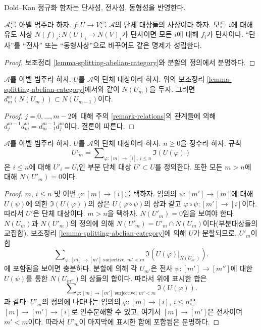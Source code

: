 \begin{lemma}
\label{lemma-injective-map-simplicial-abelian}
\begin{slogan}
Dold--Kan 정규화 함자는 단사성, 전사성, 동형성을 반영한다.
\end{slogan}
$\mathcal{A}$를 아벨 범주라 하자.
$f : U \to V$를 $\mathcal{A}$의 단체 대상들의 사상이라 하자.
모든 $i$에 대해 유도 사상 $N(f)_i : N(U)_i \to N(V)_i$가
단사이면 모든 $i$에 대해 $f_i$가 단사이다.
``단사''를 ``전사'' 또는 ``동형사상''으로 바꾸어도 같은 명제가
성립한다.
\end{lemma}

\begin{proof}
보조정리 \ref{lemma-splitting-abelian-category}와 분할의 정의에서
분명하다.
\end{proof}


\begin{lemma}
\label{lemma-N-d-in-N}
$\mathcal{A}$를 아벨 범주라 하자.
$U$를 $\mathcal{A}$의 단체 대상이라 하자.
위의 보조정리 \ref{lemma-splitting-abelian-category}에서와 같이
$N(U_m)$을 두자.
그러면 $d^m_m(N(U_m)) \subset N(U_{m - 1})$이다.
\end{lemma}

\begin{proof}
$j = 0, \ldots, m - 2$에 대해 주의 \ref{remark-relations}의 관계들에
의해 $d^{m - 1}_j d^m_m = d^{m - 1}_{m - 1} d^m_j$이다.
결론이 따른다.
\end{proof}

\begin{lemma}
\label{lemma-simplicial-abelian-n-skel-sub}
$\mathcal{A}$를 아벨 범주라 하자.
$U$를 $\mathcal{A}$의 단체 대상이라 하자.
$n \geq 0$을 정수라 하자. 규칙
$$
U'_m = \sum\nolimits_{\varphi : [m] \to [i], \ i\leq n} \Im(U(\varphi))
$$
은 $i \leq n$에 대해 $U'_i = U_i$인 부분 단체 대상
$U' \subset U$를 정의한다. 또한 모든 $m > n$에 대해
$N(U'_m) = 0$이다.
\end{lemma}

\begin{proof}
$m$, $i \leq n$ 및 어떤 $\varphi : [m] \to [i]$를 택하자.
임의의 $\psi : [m'] \to [m]$에 대해 $U(\psi)$에 의한
$\Im(U(\varphi))$의 상은 $U(\varphi \circ \psi)$의 상과 같고
$\varphi \circ \psi : [m'] \to [i]$이다.
따라서 $U'$은 단체 대상이다. $m > n$을 택하자.
$N(U'_m) = 0$임을 보여야 한다.
$N(U_m)$과 $N(U'_m)$의 정의에 의해
$N(U'_m) = U'_m \cap N(U_m)$이다(부분대상들의 교집합).
보조정리 \ref{lemma-splitting-abelian-category}에 의해 $U$가 분할되므로,
$U'_m$이 합
$$
\sum\nolimits_{\varphi : [m] \to [m']\text{ surjective}, \ m' < m}
\Im(U(\varphi)|_{N(U_{m'})}).
$$
에 포함됨을 보이면 충분하다. 분할에 의해 각 $U_{m'}$은 전사
$\psi : [m'] \to [m'']$에 대한 $U(\psi)$를 통한 $N(U_{m''})$의
상들의 합이다. 따라서 위에 표시한 합은
$$
\sum\nolimits_{\varphi : [m] \to [m']\text{ surjective}, \ m' < m}
\Im(U(\varphi)).
$$
과 같다. $U'_m$의 정의에 나타나는 임의의
$\varphi : [m] \to [i]$, $i \leq n$은
$[m] \to [m'] \to [i]$로 인수분해할 수 있고, 여기서
$[m] \to [m']$은 전사이며 $m' < m$이다.
따라서 $U'_m$이 마지막에 표시한 합에 포함됨은 분명하다.
\end{proof}

